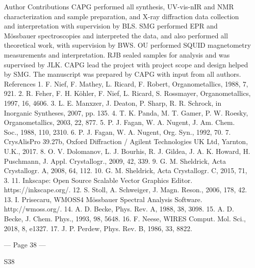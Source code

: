  
Author Contributions 
CAPG performed all synthesis, UV-vis-nIR and NMR characterization and sample preparation, and X-ray 
diffraction data collection and interpretation with supervision by BLS. SMG performed EPR and Mössbauer 
spectroscopies and interpreted the data, and also performed all theoretical work, with supervision by BWS. OU 
performed SQUID magnetometry measurements and interpretation. RJB sealed samples for analysis and was 
supervised by JLK. CAPG lead the project with project scope and design helped by SMG. The manuscript was 
prepared by CAPG with input from all authors. 
References 
1. 
F. Nief, F. Mathey, L. Ricard, F. Robert, Organometallics, 1988, 7, 921. 
2. 
R. Feher, F. H. Köhler, F. Nief, L. Ricard, S. Rossmayer, Organometallics, 1997, 16, 4606. 
3. 
L. E. Manxzer, J. Deaton, P. Sharp, R. R. Schrock, in Inorganic Syntheses, 2007, pp. 135. 
4. 
T. K. Panda, M. T. Gamer, P. W. Roesky, Organometallics, 2003, 22, 877. 
5. 
P. J. Fagan, W. A. Nugent, J. Am. Chem. Soc., 1988, 110, 2310. 
6. 
P. J. Fagan, W. A. Nugent, Org. Syn., 1992, 70. 
7. 
CrysAlisPro 39.27b, Oxford Diffraction / Agilent Technologies UK Ltd, Yarnton, U.K., 2017. 
8. 
O. V. Dolomanov, L. J. Bourhis, R. J. Gildea, J. A. K. Howard, H. Puschmann, J. Appl. Crystallogr., 2009, 
42, 339. 
9. 
G. M. Sheldrick, Acta Crystallogr. A, 2008, 64, 112. 
10. 
G. M. Sheldrick, Acta Crystallogr. C, 2015, 71, 3. 
11. 
Inkscape: Open Source Scalable Vector Graphics Editor. https://inkscape.org/. 
12. 
S. Stoll, A. Schweiger, J. Magn. Reson., 2006, 178, 42. 
13. 
I. Prisecaru, WMOSS4 Mössbauer Spectral Analysis Software. http://wmoss.org/. 
14. 
A. D. Becke, Phys. Rev. A, 1988, 38, 3098. 
15. 
A. D. Becke, J. Chem. Phys., 1993, 98, 5648. 
16. 
F. Neese, WIRES Comput. Mol. Sci., 2018, 8, e1327. 
17. 
J. P. Perdew, Phys. Rev. B, 1986, 33, 8822. 


--- Page 38 ---
 
 
S38 
 
